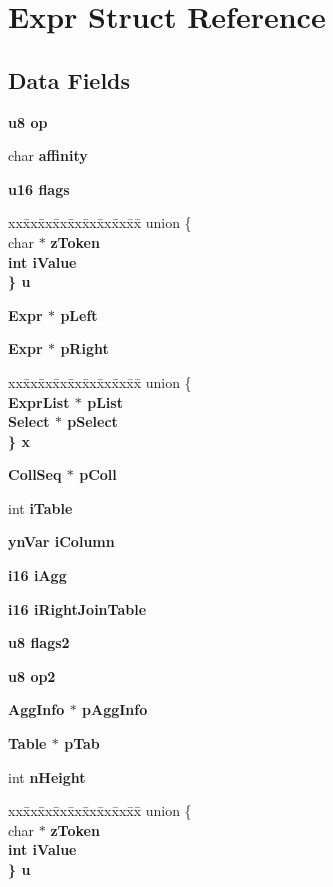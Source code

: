 \section{Expr Struct Reference}
\label{structExpr}
\subsection*{Data Fields}
\begin{CompactItemize}
\item 
\bf{u8} \bf{op}
\item 
char \bf{affinity}
\item 
\bf{u16} \bf{flags}
\item 
\begin{tabbing}
xx\=xx\=xx\=xx\=xx\=xx\=xx\=xx\=xx\=\kill
union \{\\
\>char $\ast$ \bf{zToken}\\
\>int \bf{iValue}\\
\} \bf{u}\\

\end{tabbing}\item 
\bf{Expr} $\ast$ \bf{p\-Left}
\item 
\bf{Expr} $\ast$ \bf{p\-Right}
\item 
\begin{tabbing}
xx\=xx\=xx\=xx\=xx\=xx\=xx\=xx\=xx\=\kill
union \{\\
\>\bf{ExprList} $\ast$ \bf{pList}\\
\>\bf{Select} $\ast$ \bf{pSelect}\\
\} \bf{x}\\

\end{tabbing}\item 
\bf{Coll\-Seq} $\ast$ \bf{p\-Coll}
\item 
int \bf{i\-Table}
\item 
\bf{yn\-Var} \bf{i\-Column}
\item 
\bf{i16} \bf{i\-Agg}
\item 
\bf{i16} \bf{i\-Right\-Join\-Table}
\item 
\bf{u8} \bf{flags2}
\item 
\bf{u8} \bf{op2}
\item 
\bf{Agg\-Info} $\ast$ \bf{p\-Agg\-Info}
\item 
\bf{Table} $\ast$ \bf{p\-Tab}
\item 
int \bf{n\-Height}
\item 
\begin{tabbing}
xx\=xx\=xx\=xx\=xx\=xx\=xx\=xx\=xx\=\kill
union \{\\
\>char $\ast$ \bf{zToken}\\
\>int \bf{iValue}\\
\} \bf{u}\\


\end{tabbing}
\end{CompactItemize}
